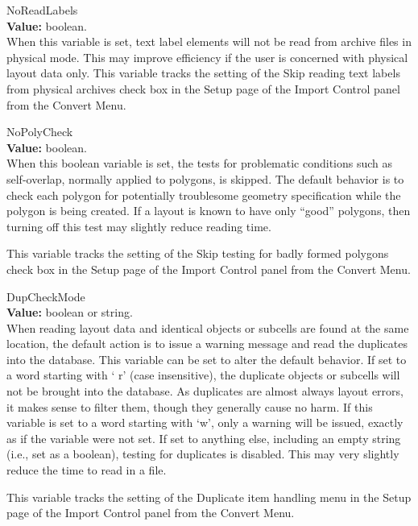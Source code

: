 \begin{description}
\item{\et NoReadLabels}\\
{\bf Value:} boolean.\\
When this variable is set, text label elements will not be read from
archive files in physical mode.  This may improve efficiency if the
user is concerned with physical layout data only.  This variable
tracks the setting of the {\cb Skip reading text labels from physical
archives} check box in the {\cb Setup} page of the {\cb Import
Control} panel from the {\cb Convert Menu}.

\item{\et NoPolyCheck}\\
{\bf Value:} boolean.\\
When this boolean variable is set, the tests for problematic
conditions such as self-overlap, normally applied to polygons, is
skipped.  The default behavior is to check each polygon for
potentially troublesome geometry specification while the polygon is
being created.  If a layout is known to have only ``good'' polygons,
then turning off this test may slightly reduce reading time.

This variable tracks the setting of the {\cb Skip testing for badly
formed polygons} check box in the {\cb Setup} page of the {\cb Import
Control} panel from the {\cb Convert Menu}.

\item{\et DupCheckMode}\\
{\bf Value:} boolean or string.\\
When reading layout data and identical objects or subcells are found
at the same location, the default action is to issue a warning message
and read the duplicates into the database.  This variable can be set
to alter the default behavior.  If set to a word starting with `{\vt
r}' (case insensitive), the duplicate objects or subcells will not be
brought into the database.  As duplicates are almost always layout
errors, it makes sense to filter them, though they generally cause no
harm.  If this variable is set to a word starting with `{\vt w}', only
a warning will be issued, exactly as if the variable were not set.  If
set to anything else, including an empty string (i.e., set as a
boolean), testing for duplicates is disabled.  This may very slightly
reduce the time to read in a file.

This variable tracks the setting of the {\cb Duplicate item handling}
menu in the {\cb Setup} page of the {\cb Import Control} panel from
the {\cb Convert Menu}.


\end{description}

